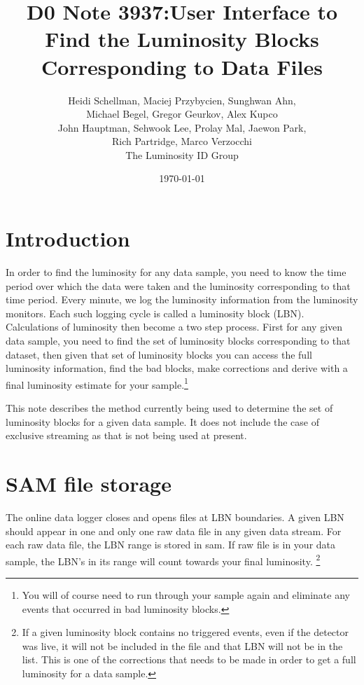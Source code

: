 \documentclass[12pt]{article}
\begin{document}
\author{Heidi Schellman, Maciej Przybycien, Sunghwan Ahn, \\Michael Begel, Gregor Geurkov, Alex Kupco
\\John Hauptman, Sehwook Lee, Prolay Mal, Jaewon Park,\\ Rich Partridge, Marco Verzocchi \\
The Luminosity ID Group}
\title{D0 Note 3937:User Interface to Find the Luminosity Blocks Corresponding to Data Files}
\date{\today}
\maketitle

\section{Introduction}
In order to find the luminosity for any data sample, you need to know the time period
over which the data were taken and the luminosity corresponding to that time period.
Every minute, we log the luminosity information from the luminosity monitors.
Each such logging cycle is called a luminosity block (LBN).  Calculations of
luminosity then become a two step process. First for any given data sample, you
need to find the set of luminosity blocks corresponding to
that dataset,  then given that set of luminosity blocks you
can access the full luminosity information, find the bad blocks, make
corrections and derive
with a final luminosity estimate for your sample.\footnote{You will of course need
to run through your sample again and eliminate any events that occurred in bad
luminosity blocks.}





This note describes the method currently being used to determine the set of luminosity
blocks for a given data sample.  It does not include the case of exclusive streaming
as that is not being used at present.

\section{SAM file storage}

The online data logger closes and opens files at LBN boundaries.  A given LBN
should appear in one and only one raw data file in any given data stream.  For each raw
data file, the LBN range is stored in sam. If raw file is in your data sample,
the LBN's  in its range will count towards your final luminosity. \footnote{If a given
luminosity block contains no triggered events, even if the detector was live, it
will not be included in the file and that LBN will not be in the list.  This is
one of the corrections that needs to be made in order to get a full luminosity
for a data sample.}%
\end{document}

